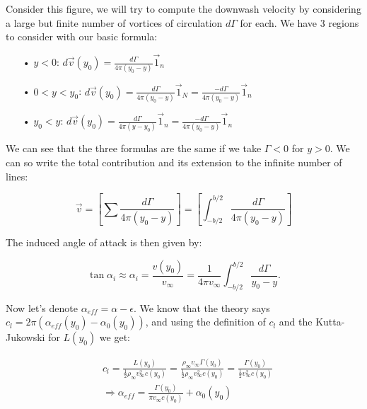 	Consider this figure, we will try to compute the downwash velocity by considering a large but finite number of vortices of circulation $d \Gamma$ for each. We have 3 regions to consider with our basic formula:
	
	\begin{itemize}
	\item[•] $y<0$: $d\vec{v}(y_0) =  \frac{d \Gamma}{4\pi (y_0-y)}\vec{1}_n$
	\item[•] $0<y<y_0$: $d\vec{v}(y_0) = \frac{d \Gamma}{4\pi (y_0-y)}\vec{1}_N = \frac{-d \Gamma}{4\pi (y_0-y)}\vec{1}_n$
	\item[•] $y_0<y$: $d\vec{v}(y_0) =  \frac{d \Gamma}{4\pi (y-y_0)}\vec{1}_n = \frac{-d \Gamma}{4\pi (y_0-y)}\vec{1}_n$  
	\end{itemize}
	
	We can see that the three formulas are the same if we take $\Gamma < 0$ for $y>0$. We can so write the total contribution and its extension to the infinite number of lines:
	
	\begin{equation}
	\vec{v} = \left[ \sum \frac{d\Gamma}{4\pi (y_0 - y)} \right] = \left[ \int _{-b/2}^{b/2} \frac{d\Gamma}{4\pi (y_0 - y)} \right]
	\end{equation}
	
	The induced angle of attack is then given by:
	
	\begin{equation}
	\tan \alpha _i \approx \alpha _i = \frac{v(y_0)}{v_\infty} = \frac{1}{4\pi v_\infty} \int _{-b/2} ^{b/2}\frac{d\Gamma}{y_0-y}.
	\label{eq:3.18}
	\end{equation}
	
	Now let's denote $\alpha _{eff} = \alpha - \epsilon$. We know that the theory says $c_l = 2\pi (\alpha _{eff}(y_0)- \alpha _0(y_0))$, and using the definition of $c_l$ and the Kutta-Jukowski for $L(y_0)$ we get:
	
	\begin{equation}
	\begin{aligned}	
	&c_l = \frac{L(y_0)}{\frac{1}{2}\rho_\infty v_\infty ^2 c(y_0)} = \frac{\rho _\infty v_\infty \Gamma (y_0)}{\frac{1}{2}\rho_\infty v_\infty ^2 c(y_0)} = \frac{\Gamma (y_0)}{\frac{1}{2}v_\infty ^2 c(y_0)} \\
	&\Rightarrow \alpha _{eff} = \frac{\Gamma (y_0)}{\pi v_\infty c(y_0)} + \alpha _0(y_0)
	\end{aligned}
	\end{equation}
	

